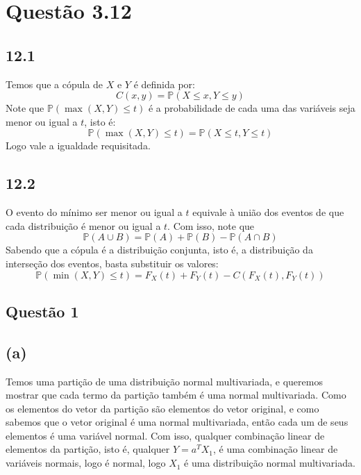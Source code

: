 \documentclass[12pt]{article}
\begin{document}
\section*{Questão 3.12}

\subsection*{12.1}
Temos que a cópula de $X$ e $Y$ é definida por:
\begin{equation*}
C(x,y)=\mathbb{P}(X\leq x, Y\leq y )
\end{equation*}
Note que $\mathbb{P}(\max(X,Y)\leq t)$ é a probabilidade de cada uma das variáveis seja menor ou igual a $t$, isto é:
\begin{equation*}
\mathbb{P}(\max(X,Y)\leq t)=\mathbb{P}(X\leq t,Y\leq t)
\end{equation*}
Logo vale a igualdade requisitada.

\subsection*{12.2}
O evento do mínimo ser menor ou igual a $t$ equivale à união dos eventos de que cada distribuição é menor ou igual a $t$. Com isso, note que 
\begin{equation*}
\mathbb{P}(A\cup B)=\mathbb{P}(A)+\mathbb{P}(B)-\mathbb{P}(A\cap B)
\end{equation*}
Sabendo que a cópula é a distribuição conjunta, isto é, a distribuição da interseção dos eventos, basta substituir os valores:
\begin{equation*}
\mathbb{P}(\min(X,Y)\leq t)=
F_{X}(t)+F_{Y}(t)-C(F_{X}(t),F_{Y}(t))
\end{equation*}

\subsection*{Questão 1}

\subsection*{(a)}
Temos uma partição de uma distribuição normal multivariada, e queremos mostrar que cada termo da partição também é uma normal multivariada. Como os elementos do vetor da partição são elementos do vetor original, e como sabemos que o vetor original é uma normal multivariada, então cada um de seus elementos é uma variável normal. Com isso, qualquer combinação linear de elementos da partição, isto é, qualquer $Y=a^TX_{1}$, é uma combinação linear de variáveis normais, logo é normal, logo $X_{1}$ é uma distribuição normal multivariada.
\end{document}

